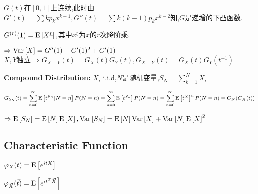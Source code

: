 $G(t) $在$ [0,1]$上连续,此时由$ G'(t) = \sum{kp_kx^{k-1}}, G''(t) = \sum{k(k-1)p_kx^{k-2}}$知,$ G$是递增的下凸函数.

$ G^{(r)}(1) = \text{E}\left[X^{\underline{r}}\right], $其中$ x^{\underline{r}}$为$ x$的$ r$次降阶乘.

$\Rightarrow \text{Var}\left[X\right] = G''(1) - G'(1)^2 + G'(1) $
\\

$ X,Y$独立$ \Rightarrow G_{X+Y}(t) = G_X(t)G_Y(t), G_{X-Y}(t) = G_X(t)G_Y(t^{-1})$

\textbf{Compound Distribution: } $ X_i $ i.i.d,$ N$是随机变量,$ S_N = \sum_{k=1}^N{X_i} $

$G_{S_N}(t) = \sum_{n=0}^\infty{\E{t^{S_N} | N=n}P(N=n)} =\sum_{n=0}^\infty{\E{t^{S_n}}P(N=n)} = \sum_{n=0}^\infty{\E{t^X}^n P(N=n)} = G_N(G_X(t)) $

$ \Rightarrow \text{E}\left[S_N\right] = \text{E}\left[N\right]\text{E}\left[X\right], \text{Var}\left[S_N\right] = \text{E}\left[N\right]\text{Var}\left[X\right] + \text{Var}\left[N\right]\text{E}\left[X\right]^2$

\subsection{Characteristic Function}
$ \varphi_X(t) = \text{E}\left[e^{itX}\right]$

$ \varphi_{\vec{X}}(\vec{t}) = \text{E}\left[e^{i\vec{t}^T\vec{X}}\right]$

